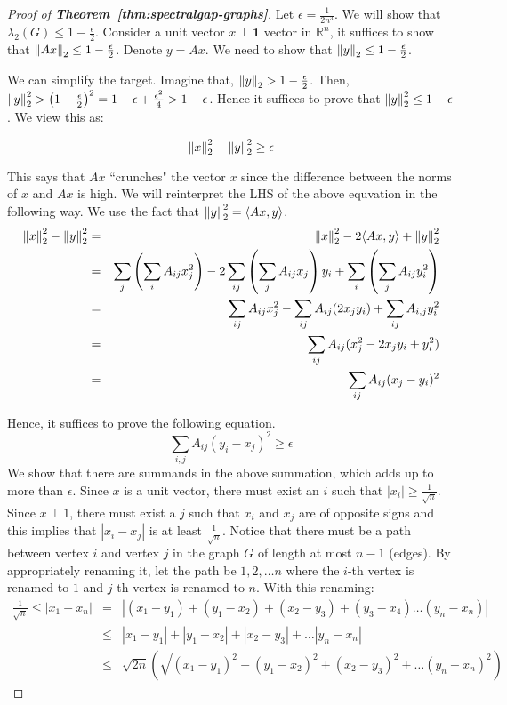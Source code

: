 \begin{proof}[{Proof of \bf Theorem~\ref{thm:spectralgap-graphs}}]
Let $\epsilon = \frac{1}{2n^3}$. We will show that $\lambda_2(G) \le 1-\frac{\epsilon}{2}$. Consider a unit vector $x \perp \textbf{1}$ vector in $\mathbb{R}^n$, it suffices to show that ${\left\lVert Ax\right\rVert}_2 \le 1 -\frac{\epsilon}{2}$. Denote $y = Ax$. We need to show that ${\left\lVert y\right\rVert}_2 \le 1-\frac{\epsilon}{2}$.

\noindent We can simplify the target. Imagine that, ${\left\lVert y\right\rVert}_2 > 1-\frac{\epsilon}{2}$. Then, ${\left\lVert y\right\rVert}_2^2 > \left(1-\frac{\epsilon}{2}\right)^2 = 1-\epsilon+\frac{\epsilon^2}{4} > 1-\epsilon$. Hence it suffices to prove that ${\left\lVert y\right\rVert}_2^2 \le 1-\epsilon$. We view this as: 

$${\left\lVert x\right\rVert}_2^2-{\left\lVert y\right\rVert}_2^2 \ge \epsilon$$

This says that $Ax$ ``crunches" the vector $x$ since the difference between the norms of $x$ and $Ax$ is high. We will reinterpret the LHS of the above equvation in the following way. We use the fact that ${\left\lVert y\right\rVert}_2^2 = \langle Ax,y \rangle$.
\begin{eqnarray*}
{\left\lVert x\right\rVert}_2^2-{\left\lVert y\right\rVert}_2^2 & = & {\left\lVert x\right\rVert}_2^2-2\langle Ax,y \rangle+{\left\lVert y\right\rVert}_2^2 \\
& = & \sum_{j} \left( \sum_i A_{ij}x_j^2 \right) - 2 \sum_{ij} \left(\sum_{j} A_{ij}x_j\right) y_i + \sum_{i} \left( \sum_j A_{ij}y_i^2 \right) \\
& = & \sum_{ij} A_{ij}x_j^2 - \sum_{ij} A_{ij}(2x_jy_i) + \sum_{ij} A_{i,j}y_i^2 \\
& = & \sum_{ij} A_{ij} (x_j^2 - 2x_jy_i + y_i^2) \\
& = & \sum_{ij} A_{ij} (x_j-y_i)^2
\end{eqnarray*}

\noindent Hence, it suffices to prove the following equation.
\begin{equation}
\sum_{i,j} A_{ij}(y_i-x_j)^2 \ge \epsilon
\label{eqn:weak-exp}
\end{equation}
We show that there are summands in the above summation, which adds up to more than $\epsilon$. Since $x$ is a unit vector, there must exist an $i$ such that $|x_i| \ge \frac{1}{\sqrt{n}}$. Since $x \perp 1$, there must exist a $j$ such that $x_i$ and $x_j$ are of opposite signs and this implies that $|x_i-x_j|$ is at least $\frac{1}{\sqrt{n}}$. Notice that there must be a path between vertex $i$ and vertex $j$ in the graph $G$ of length at most $n-1$ (edges). By appropriately renaming it, let the path be $1,2, \ldots n$ where the $i$-th vertex is renamed to $1$ and $j$-th vertex is renamed to $n$. With this renaming:
\begin{eqnarray*}
\frac{1}{\sqrt{n}} \le |x_1 - x_n| & = & \left|(x_1 - y_1) + (y_1 - x_2) + (x_2 - y_3) + (y_3-x_4) \ldots (y_n -  x_n)\right| \\
& \le & |x_1 - y_1| + |y_1 - x_2| + |x_2 - y_3| + \ldots |y_n -  x_n| \\
& \le & \sqrt{2n}\left( \sqrt{(x_1 - y_1)^2 + (y_1 - x_2)^2 + (x_2 - y_3)^2 + \ldots (y_n -  x_n)^2} \right) 
\end{eqnarray*}


\end{proof}
